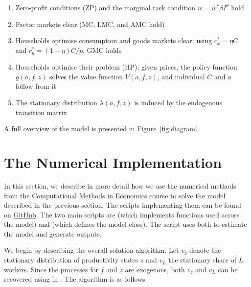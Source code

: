 \documentclass{article}
\begin{document}
\begin{enumerate}
    \vspace{-0.2cm}
    \item Zero-profit conditions (ZP) and the marginal task condition $w=w^*\beta I^\theta$ hold
    \vspace{-0.2cm}
    \item Factor markets clear (MC, LMC, and AMC hold)
    \vspace{-0.2cm}
    \item Households optimise consumption and goods markets clear: using $c_x^*=\eta C$ and $c_y^*=(1-\eta)C/p$, GMC holds
    \vspace{-0.2cm}
    \item Households optimise their problem (HP); given prices, the policy function $g(a,f,z)$ solves the value function $V(a,f,z)$, and individual $C$ and $a$ follow from it
    \vspace{-0.2cm}
    \item The stationary distribution $\lambda(a,f,z)$ is induced by the endogenous transition matrix
    \vspace{-0.2cm}
\end{enumerate}

A full overview of the model is presented in Figure~\ref{fig:diagram}.

\vspace{-0.6cm}
\section{The Numerical Implementation}
\vspace{-0.3cm}

In this section, we describe in more detail how we use the numerical methods from the Computational Methods in Economics course to solve the model described in the previous section. The scripts implementing them can be found on \href{https://github.com/luisfelipelins/Computational-Methods-in-Economics}{GitHub}. The two main scripts are  (which implements functions used across the model) and  (which defines the model class). The  script uses both to estimate the model and generate outputs.

We begin by describing the overall solution algorithm. Let $v_z$ denote the stationary distribution of productivity states $z$ and $v_L$ the stationary share of $L$ workers. Since the processes for $f$ and $z$ are exogenous, both $v_z$ and $v_L$ can be recovered using   in . The algorithm is as follows:
\end{document}

